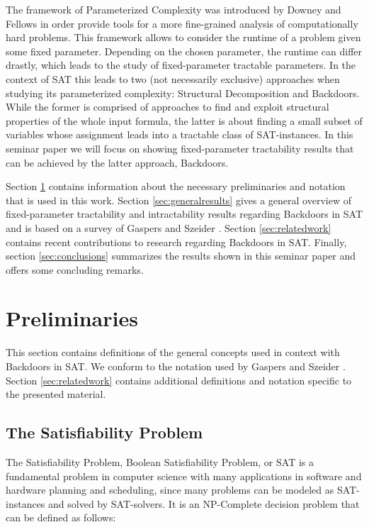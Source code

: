\documentclass[11pt,a4paper]{article}
\makeatletter
\newcommand{\problemtitle}[1]{\gdef\@problemtitle{#1}}%
\newcommand{\probleminput}[1]{\gdef\@probleminput{#1}}%
\newcommand{\problemquestion}[1]{\gdef\@problemquestion{#1}}%
\theoremstyle{definition}
\makeatother
\begin{document}
The framework of Parameterized Complexity was introduced by Downey and Fellows \cite{} in order provide tools for a more fine-grained analysis of computationally hard problems. This framework allows to consider the runtime of a problem given some fixed parameter. Depending on the chosen parameter, the runtime can differ drastly, which leads to the study of fixed-parameter tractable parameters. In the context of SAT this leads to two (not necessarily exclusive) approaches when studying its parameterized complexity: Structural Decomposition and Backdoors. While the former is comprised of approaches to find and exploit structural properties of the whole input formula, the latter is about finding a small subset of variables whose assignment leads into a tractable class of SAT-instances. In this seminar paper we will focus on showing fixed-parameter tractability results that can be achieved by the latter approach, Backdoors. 

Section \ref{sec:preliminaries} contains information about the necessary preliminaries and notation that is used in this work. Section \ref{sec:generalresults} gives a general overview of fixed-parameter tractability and intractability results regarding Backdoors in SAT and is based on a survey of Gaspers and Szeider \cite{Gaspers2012}. Section \ref{sec:relatedwork} contains recent contributions to research regarding Backdoors in SAT. Finally, section \ref{sec:conclusions} summarizes the results shown in this seminar paper and offers some concluding remarks. 



\section{Preliminaries}
\label{sec:preliminaries}
This section contains definitions of the general concepts used in context with Backdoors in SAT. We conform to the notation used by Gaspers and Szeider \cite{Gaspers2012}. Section \ref{sec:relatedwork} contains additional definitions and notation specific to the presented material. 
\subsection{The Satisfiability Problem}
The Satisfiability Problem, Boolean Satisfiability Problem, or SAT is a fundamental problem in computer science with many applications in software and hardware planning and scheduling, since many problems can be modeled as SAT-instances and solved by SAT-solvers. It is an NP-Complete decision problem that can be defined as follows: 
\begin{csproblem}
\problemtitle{SAT}
\probleminput{A propositional logic formula $F$ in conjunctive normal form (CNF) over propositional variables $X = \{x_1, x_2, ... , x_n\}$}
\problemquestion{Is there a truth assignment $\tau: X \to \{0,1\}$ (or $\tau \in 2^X$) such that $F[\tau]$ evaluates to $1$?}
\end{csproblem}
\end{document}
